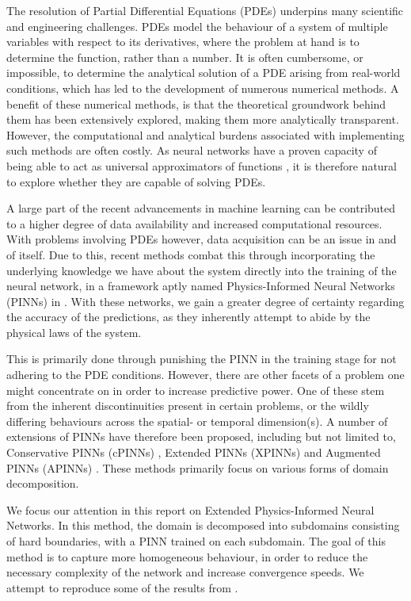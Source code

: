 The resolution of Partial Differential Equations (PDEs) underpins many scientific and engineering challenges.
PDEs model the behaviour of a system of multiple variables with respect to its derivatives, where the problem at hand is to determine the function, rather than a number.
It is often cumbersome, or impossible, to determine the analytical solution of a PDE arising from real-world conditions, which has led to the development of numerous numerical methods.
A benefit of these numerical methods, is that the theoretical groundwork behind them has been extensively explored, making them more analytically transparent.
However, the computational and analytical burdens associated with implementing such methods are often costly.
As neural networks have a proven capacity of being able to act as universal approximators of functions \cite{Cybenko1989ApproximationBS}, it is therefore natural to explore whether they are capable of solving PDEs.

A large part of the recent advancements in machine learning can be contributed to a higher degree of data availability and increased computational resources.
With problems involving PDEs however, data acquisition can be an issue in and of itself.
Due to this, recent methods combat this through incorporating the underlying knowledge we have about the system directly into the training of the neural network, in a framework aptly named Physics-Informed Neural Networks (PINNs) in \textcite{RAISSI2019686}.
With these networks, we gain a greater degree of certainty regarding the accuracy of the predictions, as they inherently attempt to abide by the physical laws of the system.

This is primarily done through punishing the PINN in the training stage for not adhering to the PDE conditions.
However, there are other facets of a problem one might concentrate on in order to increase predictive power.
One of these stem from the inherent discontinuities present in certain problems, or the wildly differing behaviours across the spatial- or temporal dimension(s).
A number of extensions of PINNs have therefore been proposed, including but not limited to, Conservative PINNs (cPINNs) \cite{2020CMAME.36513028J}, Extended PINNs (XPINNs) \cite{Jagtap2020ExtendedPN} and Augmented PINNs (APINNs) \cite{Hu_2023}.
These methods primarily focus on various forms of domain decomposition.

We focus our attention in this report on Extended Physics-Informed Neural Networks.
In this method, the domain is decomposed into subdomains consisting of hard boundaries, with a PINN trained on each subdomain.
The goal of this method is to capture more homogeneous behaviour, in order to reduce the necessary complexity of the network and increase convergence speeds.
We attempt to reproduce some of the results from \textcite{XPINN_generalize}.

